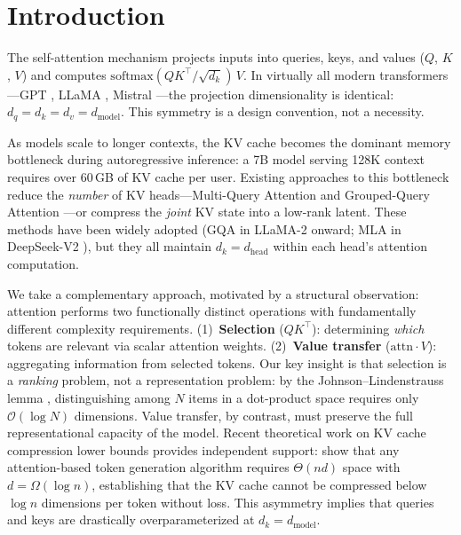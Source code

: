 \documentclass[11pt]{article}
\newcommand{\dmodel}{d_{\text{model}}}
\newcommand{\dhead}{d_{\text{head}}}
\newcommand{\softmax}{\text{softmax}}
\newcommand{\BigO}{\mathcal{O}}
\begin{document}
\section{Introduction}

The self-attention mechanism \citep{vaswani2017attention} projects inputs into queries, keys, and values ($Q$, $K$, $V$) and computes $\softmax(QK^\top\!/\!\sqrt{d_k})\,V$. In virtually all modern transformers---GPT \citep{radford2018improving}, LLaMA \citep{touvron2023llama}, Mistral \citep{jiang2023mistral}---the projection dimensionality is identical: $d_q = d_k = d_v = \dmodel$. This symmetry is a design convention, not a necessity.

As models scale to longer contexts, the KV cache becomes the dominant memory bottleneck during autoregressive inference: a 7B model serving 128K context requires over 60\,GB of KV cache per user. Existing approaches to this bottleneck reduce the \emph{number} of KV heads---Multi-Query Attention \citep{shazeer2019fast} and Grouped-Query Attention \citep{ainslie2023gqa}---or compress the \emph{joint} KV state into a low-rank latent. These methods have been widely adopted (GQA in LLaMA-2 \citep{touvron2023llama} onward; MLA in DeepSeek-V2 \citep{liu2024deepseek}), but they all maintain $d_k = \dhead$ within each head's attention computation.

We take a complementary approach, motivated by a structural observation: attention performs two functionally distinct operations with fundamentally different complexity requirements. (1)~\textbf{Selection} ($QK^\top$): determining \emph{which} tokens are relevant via scalar attention weights. (2)~\textbf{Value transfer} ($\text{attn} \cdot V$): aggregating information from selected tokens. Our key insight is that selection is a \emph{ranking} problem, not a representation problem: by the Johnson--Lindenstrauss lemma \citep{johnson1984extensions}, distinguishing among $N$ items in a dot-product space requires only $\BigO(\log N)$ dimensions. Value transfer, by contrast, must preserve the full representational capacity of the model. Recent theoretical work on KV cache compression lower bounds provides independent support: \citet{compressionbarriers2025} show that any attention-based token generation algorithm requires $\Theta(nd)$ space with $d = \Omega(\log n)$, establishing that the KV cache cannot be compressed below $\log n$ dimensions per token without loss. This asymmetry implies that queries and keys are drastically overparameterized at $d_k = \dmodel$.
\end{document}
